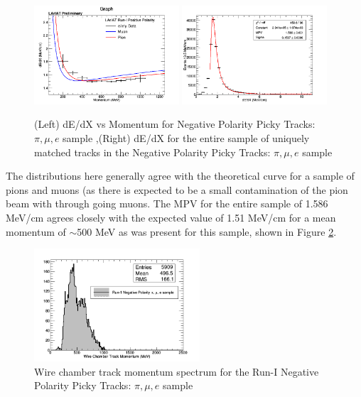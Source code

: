 \begin{figure}[htb]
\centering
\includegraphics[width=0.48\textwidth]{images/dEdXvsMomentumPosPolRun1FineBin.png}
\includegraphics[width=0.48\textwidth]{images/dEdXNegPolRun1.png}
\caption{(Left) dE/dX vs Momentum for Negative Polarity Picky Tracks: $\pi, \mu, e$ sample ,(Right) dE/dX for the entire sample of uniquely matched tracks in the Negative Polarity Picky Tracks: $\pi, \mu, e$ sample }
\label{fig:Run1NegPickyTrkPiMuEResults}
\end{figure}

The distributions here generally agree with the theoretical curve for a sample of pions and muons (as there is expected to be a small contamination of the pion beam with through going muons. The MPV for the entire sample of 1.586 MeV/cm agrees closely with the expected value of 1.51 MeV/cm for a mean momentum of $\sim$500 MeV as was present for this sample, shown in Figure \ref{fig:Run1NegPickyTrkPiMuEMomentumSpec}.

\begin{figure}[htb]
\centering
\includegraphics[width=0.55\textwidth]{images/WCTrkMomentumRun1NegPiMuE.png}
\caption{Wire chamber track momentum spectrum for the Run-I Negative Polarity Picky Tracks: $\pi, \mu, e$ sample  }
\label{fig:Run1NegPickyTrkPiMuEMomentumSpec}
\end{figure}

